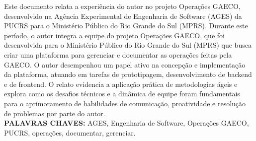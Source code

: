 \begin{resumo}
  
Este documento relata a experiência do autor no projeto Operações GAECO, desenvolvido na Agência Experimental de Engenharia de Software (AGES) da PUCRS para o Ministério Público do Rio Grande do Sul (MPRS). Durante este período, o autor integra a equipe do projeto Operações GAECO, que foi desenvolvida para o Ministério Público do Rio Grande do Sul (MPRS) que busca criar uma plataforma para gerenciar e documentar as operações feitas pela GAECO. O autor desempenhou um papel ativo na concepção e implementação da plataforma, atuando em tarefas de prototipagem, desenvolvimento de backend e de frontend. O relato evidencia a aplicação prática de metodologias ágeis e explora como os desafios técnicos e a dinâmica de equipe foram fundamentais para o aprimoramento de habilidades de comunicação, proatividade e resolução de problemas por parte do autor.  \bigbreak\
  \\\textbf{PALAVRAS CHAVES:}
AGES, Engenharia de Software, Operações GAECO, PUCRS, operações, documentar, gerenciar.  
\end{resumo}